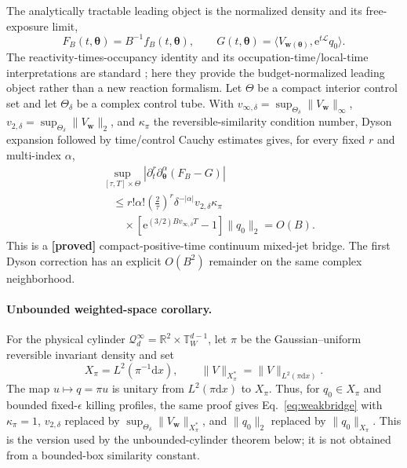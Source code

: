 \documentclass[aps,physrev,reprint,amsmath,amssymb,longbibliography,floatfix]{revtex4-2}
\newcommand{\dd}{\mathrm d}
\newcommand{\e}{\mathrm e}
\newcommand{\Lfree}{\mathcal L}
\newcommand{\status}[1]{\textbf{[#1]}}
\begin{document}
The analytically tractable leading object is the normalized density and its
free-exposure limit,
\begin{equation}
 F_B(t,\bm\theta)=B^{-1}f_B(t,\bm\theta),\qquad
 G(t,\bm\theta)=\langle V_{\bm w(\bm\theta)},
 \e^{t\Lfree}q_0\rangle.
\label{eq:freeexposure}
\end{equation}
The reactivity-times-occupancy identity and its occupation-time/local-time
interpretations are standard
\cite{pruestelMeierSchellersheim2014area,bressloff2022feynmanKac,
grebenkov2007residence,grebenkov2020multiple}; here they provide the
budget-normalized leading object rather than a new reaction formalism.
Let $\Theta$ be a compact interior control set and let $\Theta_\delta$ be a
complex control tube.  With
$v_{\infty,\delta}=\sup_{\Theta_\delta}\|V_{\bm w}\|_\infty$,
$v_{2,\delta}=\sup_{\Theta_\delta}\|V_{\bm w}\|_2$, and $\kappa_\pi$ the
reversible-similarity condition number, Dyson expansion followed by
time/control Cauchy estimates gives, for every fixed $r$ and multi-index
$\alpha$,
\begin{align}
&\sup_{[\tau,T]\times\Theta}
\left|\partial_t^r\partial_{\bm\theta}^{\alpha}(F_B-G)\right|
\nonumber\\
&\quad\le r!\alpha!\left(\frac{2}{\tau}\right)^r
\delta^{-|\alpha|}v_{2,\delta}\kappa_\pi\nonumber\\
&\qquad\times
\left[\e^{(3/2)Bv_{\infty,\delta}T}-1\right]\|q_0\|_2
=O(B).
\label{eq:weakbridge}
\end{align}
This is a \status{proved} compact-positive-time continuum mixed-jet bridge.
The first Dyson correction has an explicit $O(B^2)$ remainder on the same
complex neighborhood.

\paragraph{Unbounded weighted-space corollary.}
For the physical cylinder
$\mathcal Q_d^\infty=\mathbb R^2\times\mathbb T_W^{d-1}$, let $\pi$ be the
Gaussian--uniform reversible invariant density and set
\begin{equation}
 X_\pi=L^2(\pi^{-1}\dd x),\qquad
 \|V\|_{X_\pi^*}=\|V\|_{L^2(\pi\dd x)}.
\label{eq:weightedspace}
\end{equation}
The map $u\mapsto q=\pi u$ is unitary from $L^2(\pi\dd x)$ to $X_\pi$.
Thus, for $q_0\in X_\pi$ and bounded fixed-$\epsilon$ killing profiles, the
same proof gives Eq.~\eqref{eq:weakbridge} with $\kappa_\pi=1$,
$v_{2,\delta}$ replaced by
$\sup_{\Theta_\delta}\|V_{\bm w}\|_{X_\pi^*}$, and $\|q_0\|_2$ replaced by
$\|q_0\|_{X_\pi}$.  This is the version used by the unbounded-cylinder
theorem below; it is not obtained from a bounded-box similarity constant.
\end{document}
